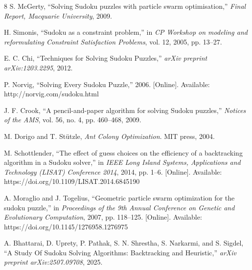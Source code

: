 \documentclass[runningheads]{llncs}
\begin{document}
\begin{thebibliography}{8}
    S. McGerty, ``Solving Sudoku puzzles with particle swarm optimisation,'' \emph{Final Report, Macquarie University}, 2009.

    H. Simonis, ``Sudoku as a constraint problem,'' in \emph{CP Workshop on modeling and reformulating Constraint Satisfaction Problems}, vol. 12, 2005, pp. 13--27.

    E. C. Chi, ``Techniques for Solving Sudoku Puzzles,'' \emph{arXiv preprint arXiv:1203.2295}, 2012.

    P. Norvig, ``Solving Every Sudoku Puzzle,'' 2006. [Online]. Available: http://norvig.com/sudoku.html

    J. F. Crook, ``A pencil-and-paper algorithm for solving Sudoku puzzles,'' \emph{Notices of the AMS}, vol. 56, no. 4, pp. 460--468, 2009.

    M. Dorigo and T. St\"{u}tzle, \emph{Ant Colony Optimization}. MIT press, 2004.


    M. Schottlender, ``The effect of guess choices on the efficiency of a backtracking algorithm in a Sudoku solver,'' in \emph{IEEE Long Island Systems, Applications and Technology (LISAT) Conference 2014}, 2014, pp. 1--6. [Online]. Available: https://doi.org/10.1109/LISAT.2014.6845190

    A. Moraglio and J. Togelius, ``Geometric particle swarm optimization for the sudoku puzzle,'' in \emph{Proceedings of the 9th Annual Conference on Genetic and Evolutionary Computation}, 2007, pp. 118--125. [Online]. Available: https://doi.org/10.1145/1276958.1276975

    A. Bhattarai, D. Uprety, P. Pathak, S. N. Shrestha, S. Narkarmi, and S. Sigdel, ``A Study Of Sudoku Solving Algorithms: Backtracking and Heuristic,'' \emph{arXiv preprint arXiv:2507.09708}, 2025.


\end{thebibliography}
\end{document}
